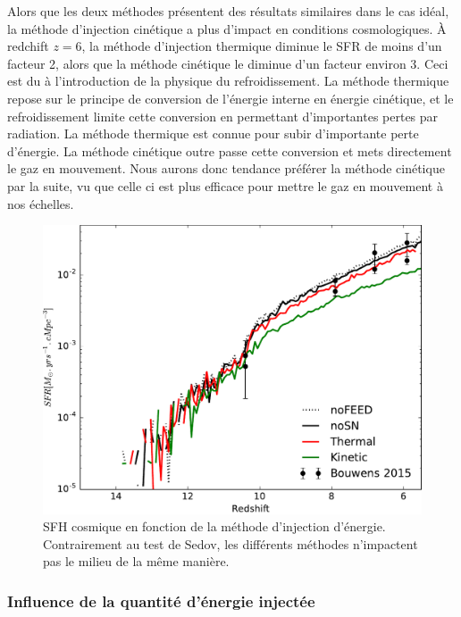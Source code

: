 Alors que les deux méthodes présentent des résultats similaires dans le cas idéal, la méthode d'injection cinétique a plus d'impact en conditions cosmologiques.
À redchift $z=6$, la méthode d'injection thermique diminue le \ac{SFR} de moins d'un facteur 2, alors que la méthode cinétique le diminue d'un facteur environ 3.
Ceci est du à l'introduction de la physique du refroidissement.
La méthode thermique repose sur le principe de conversion de l'énergie interne en énergie cinétique, et le refroidissement limite cette conversion en permettant d'importantes pertes par radiation.
La méthode thermique est connue %
pour subir d'importante perte d'énergie.
La méthode cinétique outre passe cette conversion et mets directement le gaz en mouvement.
Nous aurons donc tendance préférer la méthode cinétique par la suite, vu que celle ci est plus efficace pour mettre le gaz en mouvement à nos échelles.


\begin{figure}
        \includegraphics[width=.95\textwidth]{img/03/sedov/SFRmethode.pdf} 
        \caption[SFH cosmique en fonction de la méthode d'injection d'énergie]{SFH cosmique en fonction de la méthode d'injection d'énergie.
        Contrairement au test de Sedov, les différents méthodes n'impactent pas le milieu de la même manière.
        }
 		\label{fig:sfr_methode}
\end{figure}



\subsubsection{Influence de la quantité d'énergie injectée}
\label{sec:snegy}

